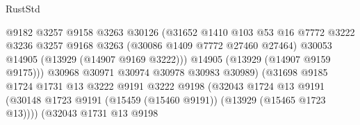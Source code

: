 \begin{lexlean}{RustStd}
\begin{coremodule}
                                            @9182
                                            @3257
                                            @9158
                                            @3263
                                            @30126
                                            (@31652
                                              @1410
                                              @103
                                              @53
                                              @16
                                              @7772
                                              @3222
                                              @3236
                                              @3257
                                              @9168
                                              @3263
                                              (@30086 @1409 @7772 @27460 @27464)
                                              @30053
                                              @14905
                                              (@13929 (@14907 @9169 @3222)))
                                            @14905
                                            (@13929 (@14907 @9159 @9175)))
                                          @30968
                                          @30971
                                          @30974
                                          @30978
                                          @30983
                                          @30989)
                                        (@31698
                                          @9185
                                          @1724
                                          @1731
                                          @13
                                          @3222
                                          @9191
                                          @3222
                                          @9198
                                          (@32043
                                            @1724
                                            @13
                                            @9191
                                            (@30148
                                              @1723
                                              @9191
                                              (@15459 (@15460 @9191))
                                              (@13929 (@15465 @1723 @13))))
                                          (@32043
                                            @1731
                                            @13
                                            @9198

\end{coremodule}
\end{lexlean}

